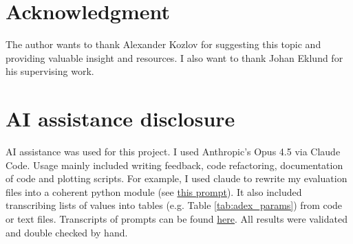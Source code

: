 \documentclass[conference]{IEEEtran}
\begin{document}
\newpage
\section*{Acknowledgment}\label{sec:ack}
The author wants to thank Alexander Kozlov for suggesting this topic and providing valuable insight and resources.
I also want to thank Johan Eklund for his supervising work.

\section*{AI assistance disclosure}\label{sec:ai}
AI assistance was used for this project.
I used Anthropic's Opus 4.5 via Claude Code.
Usage mainly included writing feedback, code refactoring, documentation of code and plotting scripts.
For example, I used claude to rewrite my evaluation files into a coherent python module (see \href{https://github.com/paulmyr/DD2375-HT25-Project-Course-in-High-Performance-Computing/blob/master/8_claude/evaluation_code_refactoring.md}{this prompt}).
It also included transcribing lists of values into tables (e.g. Table \ref{tab:adex_params}) from code or text files.
Transcripts of prompts can be found \href{https://github.com/paulmyr/DD2375-HT25-Project-Course-in-High-Performance-Computing/tree/master/8_claude}{here}.
All results were validated and double checked by hand.






\end{document}
